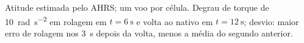 Atitude estimada pelo AHRS; um voo por célula. Degrau de torque de \SI{10}{\radian\per\second\squared} em rolagem em $t = \SI{6}{\second}$ e volta ao nativo em $t = \SI{12}{\second}$; desvio: maior erro de rolagem nos \SI{3}{\second} depois da volta, menos a média do segundo anterior.
